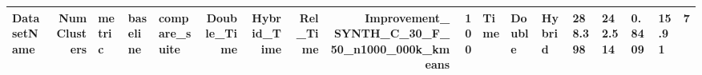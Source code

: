 \begin{tabular}{lrlllrrrrr}
\toprule
DatasetName & NumClusters & metric & baseline & compare_suite & Double_Time & Hybrid_Time & Rel_Time & Improvement_%
\midrule
SYNTH_C_30_F_50_n1000_000k_kmeans & 100 & Time & Double & Hybrid & 288.398 & 242.514 & 0.8409 & 15.91 & 7 \\
\bottomrule
\end{tabular}
